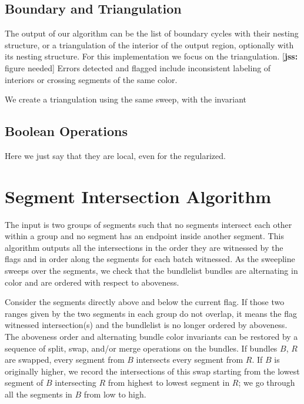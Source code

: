 \documentclass[11pt]{article}
\def\jss#1{{\footnotesize [{\bf jss:} #1]}}
\begin{document}
\subsection{Boundary and Triangulation}


The output of our algorithm can be the list of boundary cycles with their nesting structure, or a triangulation of the interior of the output region, optionally with its nesting structure. For this implementation we focus on the triangulation. \jss{figure needed}
Errors detected and flagged include inconsistent labeling of interiors or crossing segments of the same color. 

We create a triangulation using the same sweep, with the invariant  

\subsection{Boolean Operations}

Here we just say that they are local, even for the regularized. 

\section{Segment Intersection Algorithm} \label{sec inter}
The input is two groups of segments such that no segments intersect each other within a group and no segment has an endpoint inside another segment.
This algorithm outputs all the intersections in the order they are witnessed by the flags and in order along the segments for each batch witnessed.
As the sweepline sweeps over the segments, we check that the bundlelist bundles are alternating in color and are ordered with respect to aboveness.

Consider the segments directly above and below the current flag. 
If those two ranges given by the two segments in each group do not overlap, it means the flag witnessed intersection(s) and the bundlelist is no longer ordered by aboveness.
The aboveness order and alternating bundle color invariants can be restored by a sequence of split, swap, and/or merge operations on the bundles.
If bundles $B$, $R$ are swapped, every segment from $B$ intersects every segment from $R$.
If $B$ is originally higher, we record the intersections of this swap starting from the lowest segment of $B$ intersecting $R$ from highest to lowest segment in $R$; we go through all the segments in $B$ from low to high.
\end{document}
